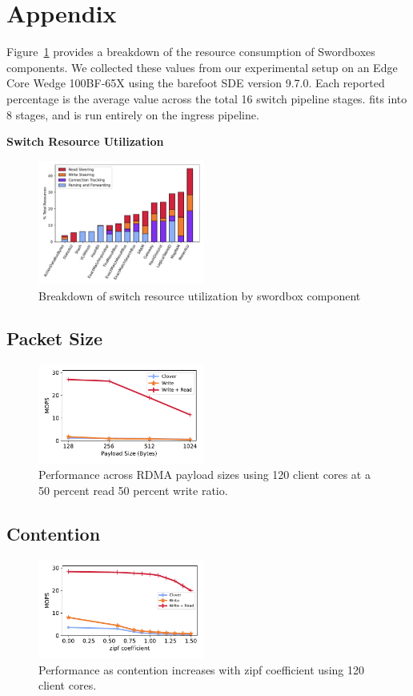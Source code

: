 \section{Appendix}

Figure~\ref{fig:switch_resources} provides a breakdown of the resource
consumption of Swordboxes components. We collected these values from our
experimental setup on an Edge Core Wedge 100BF-65X using the barefoot SDE
version 9.7.0. Each reported percentage is the average value across the total 16
switch pipeline stages. {\sword} fits into 8 stages, and is run entirely on the
ingress pipeline.

\textbf{Switch Resource Utilization}
\begin{figure}[t]
    \includegraphics[width=0.485\textwidth]{fig/switch_resources.pdf}
    \caption{Breakdown of switch resource utilization by swordbox component}
    \label{fig:switch_resources}
\end{figure}

\subsection{Packet Size}

\begin{figure}
  \centering
  \includegraphics[width=0.485\textwidth]{fig/packet_size.pdf}

    \caption{Performance across RDMA payload sizes using 120 client cores at a 50 percent read 50 percent write ratio.}

    \label{fig:packet_size}
\end{figure}

\subsection{Contention}
\begin{figure}
  \centering
  \includegraphics[width=0.485\textwidth]{fig/contention.pdf}

    \caption{Performance as contention increases with zipf coefficient using 120 client cores.}

    \label{fig:packet_size}
\end{figure}
